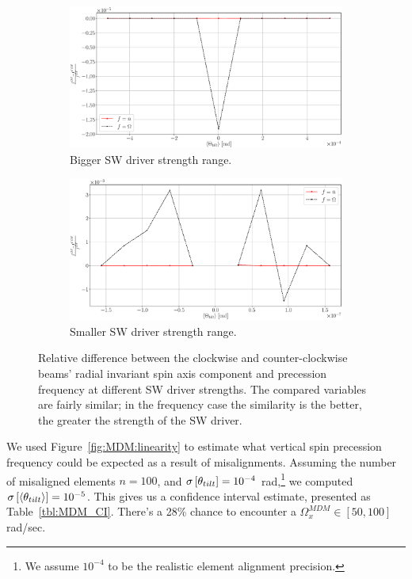 \documentclass[]{elsarticle}
\newcommand{\W}{\Omega}
\newcommand{\SD}[1]{\sigma\bkt*{#1}}
\newcommand{\avg}[1]{\langle{#1}\rangle}
\begin{document}
\begin{figure}[h]\centering
  \begin{subfigure}{\linewidth}
    \includegraphics[width=\linewidth]{img/fake_signal/linearity_test_shifting_gauss_rel_diff.eps}
    \caption{Bigger SW driver strength range.\label{fig:MDM:reldiff:SW_big}}
  \end{subfigure}
  \begin{subfigure}{\linewidth}
    \includegraphics[width=\linewidth]{img/fake_signal/linearity_test_compensated+microrad_rel_diff.eps}
    \caption{Smaller SW driver strength range.\label{fig:MDM:reldiff:SW_small}}
  \end{subfigure}
  \caption{Relative difference between the clockwise and counter-clockwise beams'
    radial invariant spin axis component and precession frequency at different SW driver strengths.
    The compared variables are fairly similar; in the frequency case the similarity is the better, the
    greater the strength of the SW driver.\label{fig:MDM:reldiff}
  }
\end{figure}

We used Figure~\ref{fig:MDM:linearity} to estimate what vertical spin precession frequency could be expected
as a result of misalignments. Assuming the number of misaligned elements $n=100$, and
$\SD{\theta_{tilt}} = 10^{-4}$ rad,\footnote{We assume $10^{-4}$ to be the realistic element alignment precision.}
we computed $\SD{\avg{\theta_{tilt}}} = 10^{-5}$. This gives us a confidence interval estimate,
presented as Table~\ref{tbl:MDM_CI}. There's a 28\% chance to encounter a $\W_x^{MDM}\in[50, 100]$ rad/sec.
\end{document}
